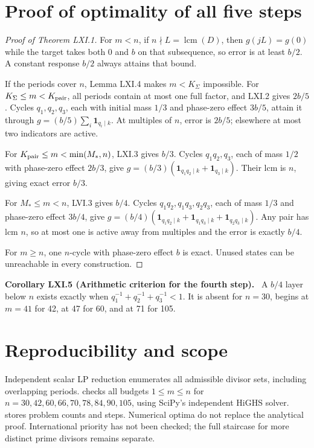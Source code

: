 \documentclass[11pt,a4paper,oneside]{book}
\newcommand{\one}{\mathbf 1}\newcommand{\ii}{\mathrm i}\newcommand{\dd}{\mathrm d}
\DeclareMathOperator{\lcm}{lcm}\DeclareMathOperator{\spanR}{span_{\mathbb R}}
\newcommand{\statement}[3]{\par\medskip\noindent\textbf{#1 #2 (#3).}\ }
\begin{document}
\section{Proof of optimality of all five steps}
\begin{proof}[Proof of Theorem LXI.1]
For $m<n$, if $n\nmid L=\lcm(D)$, then $g(jL)=g(0)$ while the target takes both 0 and $b$ on that subsequence, so error is at least $b/2$. A constant response $b/2$ always attains that bound.

If the periods cover $n$, Lemma LXI.4 makes $m<K_\Sigma$ impossible. For $K_\Sigma\le m<K_{\rm pair}$, all periods contain at most one full factor, and LXI.2 gives $2b/5$. Cycles $q_1,q_2,q_3$, each with initial mass $1/3$ and phase-zero effect $3b/5$, attain it through $g=(b/5)\sum_i\one_{q_i\mid k}$. At multiples of $n$, error is $2b/5$; elsewhere at most two indicators are active.

For $K_{\rm pair}\le m<\min(M_*,n)$, LXI.3 gives $b/3$. Cycles $q_1q_2,q_3$, each of mass $1/2$ with phase-zero effect $2b/3$, give $g=(b/3)(\one_{q_1q_2\mid k}+\one_{q_3\mid k})$. Their lcm is $n$, giving exact error $b/3$.

For $M_*\le m<n$, LVI.3 gives $b/4$. Cycles $q_1q_2,q_1q_3,q_2q_3$, each of mass $1/3$ and phase-zero effect $3b/4$, give $g=(b/4)(\one_{q_1q_2\mid k}+\one_{q_1q_3\mid k}+\one_{q_2q_3\mid k})$. Any pair has lcm $n$, so at most one is active away from multiples and the error is exactly $b/4$.

For $m\ge n$, one $n$-cycle with phase-zero effect $b$ is exact. Unused states can be unreachable in every construction.
\end{proof}
\statement{Corollary}{LXI.5}{Arithmetic criterion for the fourth step}
A $b/4$ layer below $n$ exists exactly when $q_1^{-1}+q_2^{-1}+q_3^{-1}<1$. It is absent for $n=30$, begins at $m=41$ for 42, at 47 for 60, and at 71 for 105.
\section{Reproducibility and scope}
Independent scalar LP reduction enumerates all admissible divisor sets, including overlapping periods.  checks all budgets $1\le m\le n$ for $n=30,42,60,66,70,78,84,90,105$, using SciPy's independent HiGHS solver.  stores problem counts and steps. Numerical optima do not replace the analytical proof. International priority has not been checked; the full staircase for more distinct prime divisors remains separate.
\end{document}
